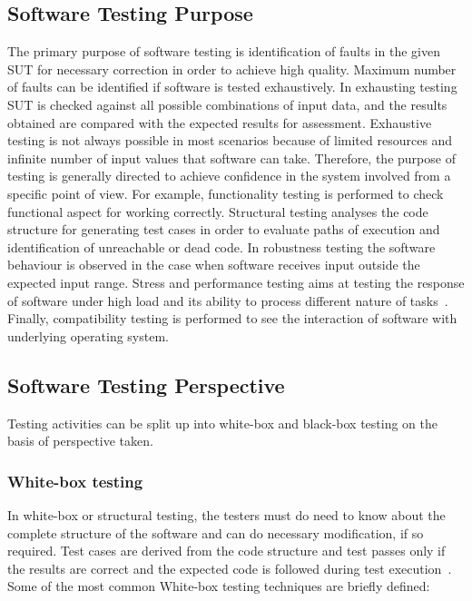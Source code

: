 \subsection{Software Testing Purpose}
The primary purpose of software testing is identification of faults in the given SUT for necessary correction in order to achieve high quality. Maximum number of faults can be identified if software is tested exhaustively. In exhausting testing SUT is checked against all possible combinations of input data, and the results obtained are compared with the expected results for assessment. Exhaustive testing is not always possible in most scenarios because of limited resources and infinite number of input values that software can take. Therefore, the purpose of testing is generally directed to achieve confidence in the system involved from a specific point of view. For example, functionality testing is performed to check functional aspect for working correctly. Structural testing analyses the code structure for generating test cases in order to evaluate paths of execution and identification of unreachable or dead code. In robustness testing the software behaviour is observed in the case when software receives input outside the expected input range. Stress and performance testing aims at testing the response of software under high load and its ability to process different nature of tasks~\cite{cohen2005robustness}. Finally, compatibility testing is performed to see the interaction of software with underlying operating system.

\subsection{Software Testing Perspective}
Testing activities can be split up into white-box and black-box testing on the basis of perspective taken. 

\subsubsection{White-box testing}
In white-box or structural testing, the testers must do need to know about the complete structure of the software and can do necessary modification, if so required. Test cases are derived from the code structure and test passes only if the results are correct and the expected code is followed during test execution~\cite{ostrand2002white}. Some of the most common White-box testing techniques are briefly defined:

